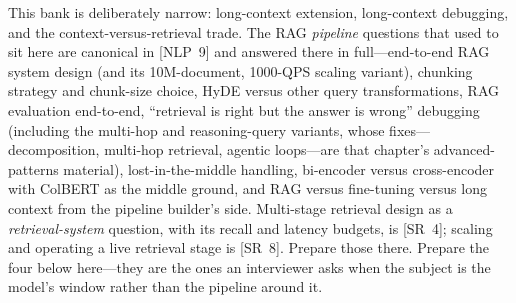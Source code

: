 \begin{keyinsight}
This bank is deliberately narrow: long-context extension, long-context debugging, and the context-versus-retrieval trade. The RAG \emph{pipeline} questions that used to sit here are canonical in [NLP~9] and answered there in full---end-to-end RAG system design (and its 10M-document, 1000-QPS scaling variant), chunking strategy and chunk-size choice, HyDE versus other query transformations, RAG evaluation end-to-end, ``retrieval is right but the answer is wrong'' debugging (including the multi-hop and reasoning-query variants, whose fixes---decomposition, multi-hop retrieval, agentic loops---are that chapter's advanced-patterns material), lost-in-the-middle handling, bi-encoder versus cross-encoder with ColBERT as the middle ground, and RAG versus fine-tuning versus long context from the pipeline builder's side. Multi-stage retrieval design as a \emph{retrieval-system} question, with its recall and latency budgets, is [SR~4]; scaling and operating a live retrieval stage is [SR~8]. Prepare those there. Prepare the four below here---they are the ones an interviewer asks when the subject is the model's window rather than the pipeline around it.
\end{keyinsight}


